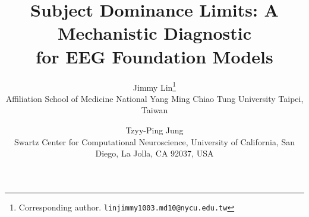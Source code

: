 \documentclass{article}
\title{Subject Dominance Limits: A Mechanistic Diagnostic \\
       for EEG Foundation Models}
\author{%
  Jimmy Lin\thanks{Corresponding author. \texttt{linjimmy1003.md10@nycu.edu.tw}} \\
  Affiliation School of Medicine National Yang Ming Chiao Tung University Taipei, Taiwan\\
  \and
  Tzyy-Ping Jung \\
  Swartz Center for Computational Neuroscience, University of California, San Diego, La Jolla, CA 92037, USA
}
\begin{document}
\maketitle



\FloatBarrier

\FloatBarrier

\FloatBarrier

\FloatBarrier

\FloatBarrier

\FloatBarrier

\FloatBarrier






\end{document}
